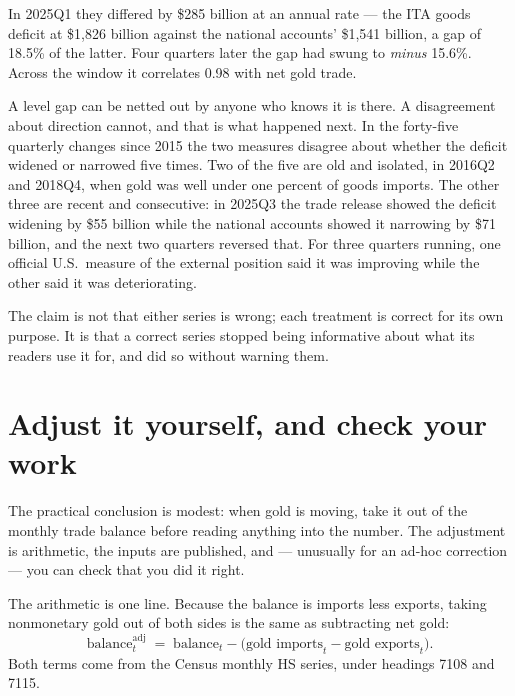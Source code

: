 \documentclass[11pt]{article}
\begin{document}
In 2025Q1 they differed by \$285 billion at an annual rate --- the ITA goods
deficit at \$1,826 billion against the national accounts' \$1,541 billion, a
gap of 18.5\% of the latter. Four quarters later the gap had swung to
\textit{minus} 15.6\%. Across the window it correlates 0.98 with net gold
trade.

A level gap can be netted out by anyone who knows it is there. A disagreement
about direction cannot, and that is what happened next. In the forty-five
quarterly changes since 2015 the two measures disagree about whether the deficit
widened or narrowed five times. Two of the five are old and isolated, in 2016Q2
and 2018Q4, when gold was well under one percent of goods imports. The other
three are recent and consecutive: in 2025Q3 the trade release showed the deficit
widening by \$55 billion while the national accounts showed it narrowing by
\$71 billion, and the next two quarters reversed that. For three quarters
running, one official U.S.\ measure of the external position said it was
improving while the other said it was deteriorating.

The claim is not that either series is wrong; each treatment is correct for its
own purpose. It is that a correct series stopped being informative about what
its readers use it for, and did so without warning them.

\section{Adjust it yourself, and check your work}

The practical conclusion is modest: when gold is moving, take it out of the
monthly trade balance before reading anything into the number. The adjustment is
arithmetic, the inputs are published, and --- unusually for an ad-hoc correction
--- you can check that you did it right.

The arithmetic is one line. Because the balance is imports less exports, taking
nonmonetary gold out of both sides is the same as subtracting net gold:
\[
  \text{balance}^{\text{adj}}_{t}
  \;=\;
  \text{balance}_{t} - \bigl(\text{gold imports}_{t} - \text{gold exports}_{t}\bigr).
\]
Both terms come from the Census monthly HS series, under headings 7108 and
7115.
\end{document}
